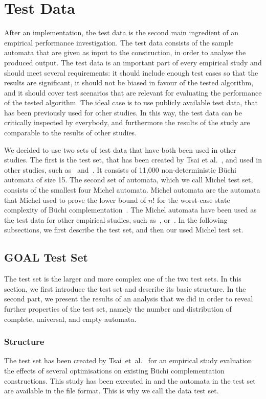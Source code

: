 \section{Test Data}
\label{4_test_data}
After an implementation, the test data is the second main ingredient of an empirical performance investigation. The test data consists of the sample automata that are given as input to the construction, in order to analyse the produced output. The test data is an important part of every empirical study and should meet several requirements: it should include enough test cases so that the results are significant, it should not be biased in favour of the tested algorithm, and it should cover test scenarios that are relevant for evaluating the performance of the tested algorithm. The ideal case is to use publicly available test data, that has been previously used for other studies. In this way, the test data can be critically inspected by everybody, and furthermore the results of the study are comparable to the results of other studies.

We decided to use two sets of test data that have both been used in other studies. The first is the \goal{} test set, that has been created by Tsai et al.~\cite{2011_tsai}, and used in other studies, such as~\cite{2012_breuers} and~\cite{2013_bsc_goettel}. It consists of 11,000 non-deterministic Büchi automata of size 15. The second set of automata, which we call Michel test set, consists of the smallest four Michel automata. Michel automata are the automata that Michel used to prove the lower bound of $n!$ for the worst-case state complexity of Büchi complementation~\cite{michel1988}. The Michel automata have been used as the test data for other empirical studies, such as~\cite{2006_althoff}, or~\cite{2013_bsc_goettel}. In the following subsections, we first describe the \goal{} test set, and then our used Michel test set.


\subsection{GOAL Test Set}
\label{4_goal_testset}
The \goal{} test set is the larger and more complex one of the two test sets. In this section, we first introduce the \goal{} test set and describe its basic structure. In the second part, we present the results of an analysis that we did in order to reveal further properties of the \goal{} test set, namely the number and distribution of complete, universal, and empty automata.

\subsubsection{Structure}
The \goal{} test set has been created by Tsai~et~al.~\cite{2011_tsai} for an empirical study evaluation the effects of several optimisations on existing Büchi complementation constructions. This study has been executed in \goal{} and the automata in the test set are available in the \goal{} file format. This is why we call the data \goal{} test set.

